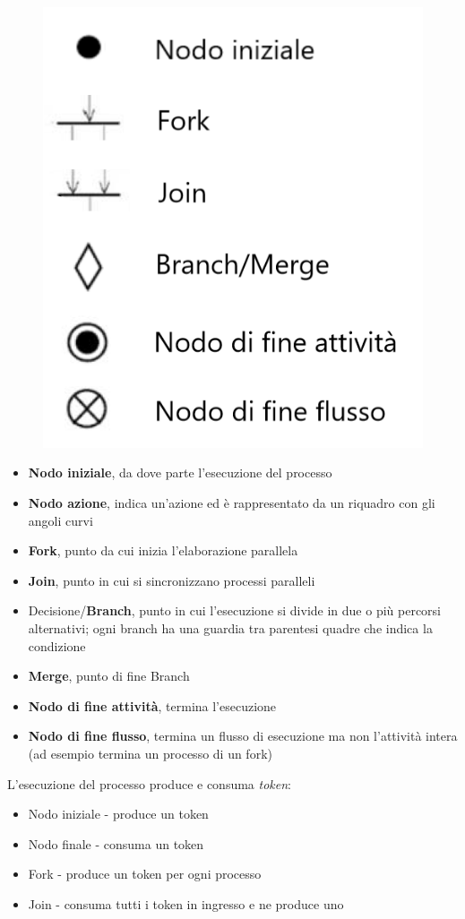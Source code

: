 \begin{figure}[H]
\centering
    \includegraphics[scale=0.3]{res/img/elementiDiagrammaAttivita}
\end{figure}
\begin{itemize}
\item \textbf{Nodo iniziale}, da dove parte l'esecuzione del processo
\item \textbf{Nodo azione}, indica un'azione ed è rappresentato da un riquadro con gli angoli curvi
\item \textbf{Fork}, punto da cui inizia l'elaborazione parallela
\item \textbf{Join}, punto in cui si sincronizzano processi paralleli
\item Decisione/\textbf{Branch}, punto in cui l'esecuzione si divide in due o più percorsi alternativi; ogni branch ha una guardia tra parentesi quadre che indica la condizione
\item \textbf{Merge}, punto di fine Branch
\item \textbf{Nodo di fine attività}, termina l'esecuzione
\item \textbf{Nodo di fine flusso}, termina un flusso di esecuzione ma non l'attività intera (ad esempio termina un processo di un fork)
\end{itemize}
L'esecuzione del processo produce e consuma \textit{token}:
\begin{itemize}
\item Nodo iniziale - produce un token
\item Nodo finale - consuma un token
\item Fork - produce un token per ogni processo
\item Join - consuma tutti i token in ingresso e ne produce uno
\end{itemize}

